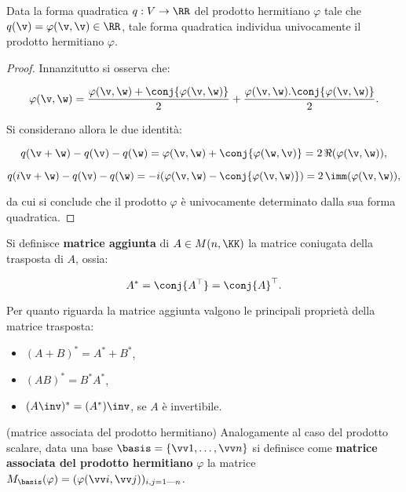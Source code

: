 \documentclass[11pt]{article}
\begin{document}
	\begin{proposition}
		Data la forma quadratica $q : V \to \RR$  del prodotto hermitiano $\varphi$ tale che $q(\v) = \varphi(\v, \v) \in \RR$, tale
		forma quadratica individua univocamente il prodotto hermitiano $\varphi$.
	\end{proposition}

	\begin{proof}
		Innanzitutto si osserva che:
		
		\[ \varphi(\v, \w) = \frac{\varphi(\v, \w) + \conj{\varphi(\v, \w)}}{2} +  \frac{\varphi(\v, \w) . \conj{\varphi(\v, \w)}}{2}. \]
		
		\vskip 0.05in
		
		Si considerano allora le due identità:
		
		\[ q(\v + \w) - q(\v) - q(\w) =
		\varphi(\v, \w) + \conj{\varphi(\w, \v)} = 2 \, \Re(\varphi(\v, \w)), \]
		
		\[ q(i\v + \w) - q(\v) - q(\w) = -i(\varphi(\v, \w) - \conj{\varphi(\v, \w)}) = 2 \, \imm(\varphi(\v, \w)), \]
		
		\vskip 0.05in
		
		da cui si conclude che il prodotto $\varphi$ è univocamente
		determinato dalla sua forma quadratica.
	\end{proof}

	\begin{definition}
		Si definisce \textbf{matrice aggiunta} di $A \in M(n, \KK)$ la matrice coniugata della trasposta di $A$, ossia:
		
		\[ A^* = \conj{A^\top} = \conj{A}^\top. \]
	\end{definition}

	\begin{remark}
		Per quanto riguarda la matrice aggiunta valgono le principali proprietà della matrice trasposta:
		
		\begin{itemize}
			\item $(A + B)^* = A^* + B^*$,
			\item $(AB)^* = B^* A^*$,
			\item $(A\inv)^* = (A^*)\inv$, se $A$ è invertibile.
		\end{itemize}
	\end{remark}

	
	\begin{definition} (matrice associata del prodotto hermitiano) Analogamente
		al caso del prodotto scalare, data una base $\basis = \{\vv 1, \ldots, \vv n\}$ si definisce
		come \textbf{matrice associata del prodotto hermitiano} $\varphi$
		la matrice $M_\basis(\varphi) = (\varphi(\vv i, \vv j))_{i,j = 1 \textrm{---} n}$.
	\end{definition}
\end{document}
